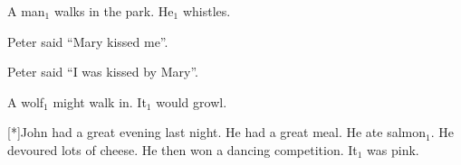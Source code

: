 \begin{exe}
   A man$_1$ walks in the park. He$_1$ whistles.
  \dotfill \pageref{ex:C-operator}
\end{exe}

\begin{exe}
   Peter said ``Mary kissed me''.
  \dotfill \pageref{ex:mary-peter}
\end{exe}

\begin{exe}
   Peter said ``I was kissed by Mary''.
  \dotfill \pageref{ex:peter-mary}
\end{exe}

\begin{exe}
   A wolf$_1$ might walk in. It$_1$ would growl.
  \dotfill \pageref{ex:modal-subordination}
\end{exe}

\begin{exe}
  [*]{John had a great evening last night. He had a great
    meal. He ate salmon$_1$. He devoured lots of cheese. He then won a
    dancing competition. It$_1$ was pink.
  \dotfill \pageref{ex:salmon}}
\end{exe}
